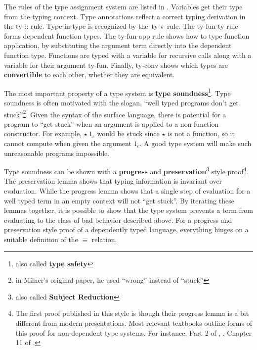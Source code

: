The rules of the type assignment system are listed in .
Variables get their type from the typing context.
Type annotations reflect a correct typing derivation in the $\textrm{ty-::}$ rule.
Type-in-type is recognized by the $\textrm{ty-}\star$ rule.
The $\textrm{ty-fun-ty}$ rule forms dependent function types.
The $\textrm{ty-fun-app}$ rule shows how to type function application, by substituting the argument term directly into the dependent function type.
Functions are typed with a variable for recursive calls along with a variable for their argument $\textrm{ty-fun}$.
Finally, $\textrm{ty-conv}$ shows which types are \textbf{convertible} to each other, whether they are equivalent.

The most important property of a type system is \textbf{type soundness}\footnote{also called \textbf{type safety}}.
Type soundness is often motivated with the slogan, ``well typed programs don't get stuck''\cite{MILNER1978348}\footnote{in Milner's original paper, he used ``wrong'' instead of ``stuck''}.
Given the syntax of the surface language, there is potential for a program to ``get stuck'' when an argument is applied to a non-function constructor.
For example, $\star\ 1_{c}$ would be stuck since $\star$ is not a function, so it cannot compute when given the argument $1_{c}$.
A good type system will make such unreasonable programs impossible.

Type soundness can be shown with a \textbf{progress} and \textbf{preservation}\footnote{also called \textbf{Subject Reduction}} style proof\footnote{
  The first proof published in this style is \cite{WRIGHT199438} though their progress lemma is a bit different from modern presentations.
  Most relevant textbooks outline forms of this proof for non-dependent type systems.
  For instance, Part 2 of \cite{pierce2002types}, \cite{KOKKE2020102440}, Chapter 11 of \cite{chlipala2017formal}.
  }.
The preservation lemma shows that typing information is invariant over evaluation.
While the progress lemma shows that a single step of evaluation for a well typed term in an empty context will not ``get stuck''.
By iterating these lemmas together, it is possible to show that the type system prevents a term from evaluating to the class of bad behavior described above.
For a progress and preservation style proof of a dependently typed language, everything hinges on a suitable definition of the $\equiv$ relation.

